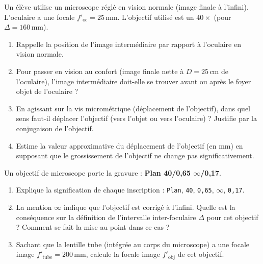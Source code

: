\documentclass[11pt]{article}
\begin{document}
\begin{exercice}
Un élève utilise un microscope réglé en vision normale (image finale à l'infini). L'oculaire a une focale $f'_{\text{oc}} = 25\,\text{mm}$. L'objectif utilisé est un $40\times$ (pour $\Delta = 160\,\text{mm}$).
\begin{enumerate}
    \item Rappelle la position de l'image intermédiaire par rapport à l'oculaire en vision normale.
    \item Pour passer en vision au confort (image finale nette à $D = 25\,\text{cm}$ de l'oculaire), l'image intermédiaire doit-elle se trouver avant ou après le foyer objet de l'oculaire ?
    \item En agissant sur la vis micrométrique (déplacement de l'objectif), dans quel sens faut-il déplacer l'objectif (vers l'objet ou vers l'oculaire) ? Justifie par la conjugaison de l'objectif.
    \item Estime la valeur approximative du déplacement de l'objectif (en mm) en supposant que le grossissement de l'objectif ne change pas significativement.
\end{enumerate}
\end{exercice}

\begin{exercice}
Un objectif de microscope porte la gravure : \textbf{Plan 40/0,65 $\infty$/0,17}.
\begin{enumerate}
    \item Explique la signification de chaque inscription : \texttt{Plan}, \texttt{40}, \texttt{0,65}, \texttt{$\infty$}, \texttt{0,17}.
    \item La mention \texttt{$\infty$} indique que l'objectif est corrigé à l'infini. Quelle est la conséquence sur la définition de l'intervalle inter-foculaire $\Delta$ pour cet objectif ? Comment se fait la mise au point dans ce cas ?
    \item Sachant que la lentille tube (intégrée au corps du microscope) a une focale image $f'_{\text{tube}} = 200\,\text{mm}$, calcule la focale image $f'_{\text{obj}}$ de cet objectif.
\end{enumerate}
\end{exercice}
\end{document}
